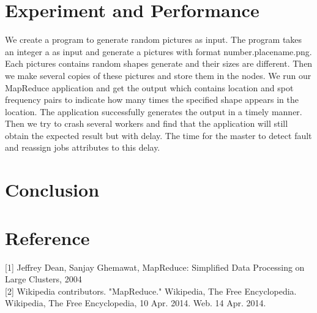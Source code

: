 \documentclass[12pt]{article}
\begin{document}
\section{Experiment and Performance }

We create a program to generate random pictures as input. The program takes an integer a as input and generate a pictures with format number.placename.png.  Each pictures contains random shapes generate and their sizes are different. Then we make several copies of these pictures and store them in the nodes. We run our MapReduce application and get the output which contains location and spot frequency pairs to indicate how many times the specified shape appears in the location. The application successfully generates the output in a timely manner. Then we try to crash several workers and find that the application will still obtain the expected result but with delay. The time for the master to detect fault and reassign jobs attributes to this delay.
  
\section {Conclusion}

\section*{Reference}
[1] Jeffrey Dean, Sanjay Ghemawat, MapReduce: Simplified Data Processing on Large Clusters, 2004 \\
{[2]} Wikipedia contributors. "MapReduce." Wikipedia, The Free Encyclopedia. Wikipedia, The Free Encyclopedia, 10 Apr. 2014. Web. 14 Apr. 2014.
\end{document}

